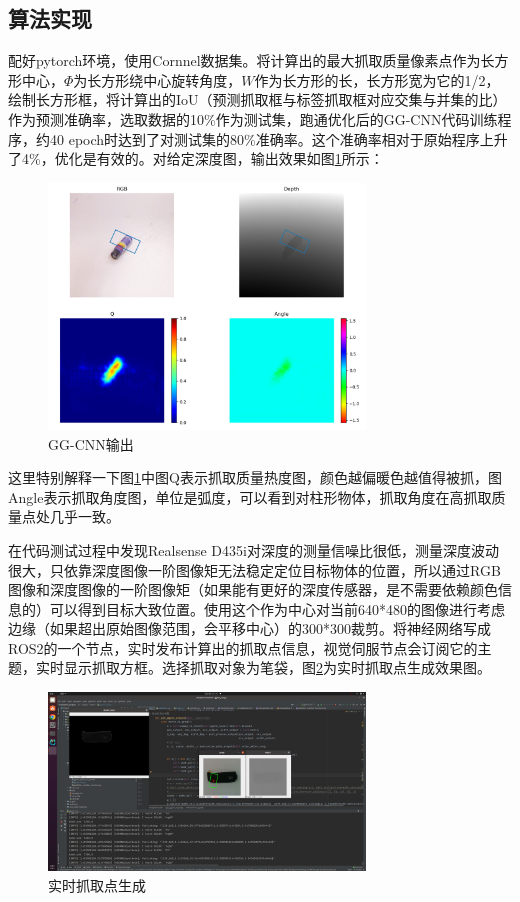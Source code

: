 \documentclass[fontset=fandol,type=bachelor,campus=harbin]{hithesisbook}
\begin{document}
\subsection{算法实现}
配好pytorch环境，使用Cornnel数据集。将计算出的最大抓取质量像素点作为长方形中心，$\varPhi$为长方形绕中心旋转角度，$W$作为长方形的长，长方形宽为它的1/2，绘制长方形框，将计算出的IoU（预测抓取框与标签抓取框对应交集与并集的比）作为预测准确率，选取数据的10\%作为测试集，跑通优化后的GG-CNN代码训练程序，约40 epoch时达到了对测试集的80\%准确率。这个准确率相对于原始程序上升了4\%，优化是有效的。对给定深度图，输出效果如图\ref{GG-CNN输出（初始）}所示：
\begin{figure}[h]
\centering
\includegraphics[width = 0.75\textwidth]{chapter3/GG-CNN输出（初始）}
\caption{GG-CNN输出}
\label{GG-CNN输出（初始）}
\end{figure}


这里特别解释一下图\ref{GG-CNN输出（初始）}中图Q表示抓取质量热度图，颜色越偏暖色越值得被抓，图Angle表示抓取角度图，单位是弧度，可以看到对柱形物体，抓取角度在高抓取质量点处几乎一致。


在代码测试过程中发现Realsense D435i对深度的测量信噪比很低，测量深度波动很大，只依靠深度图像一阶图像矩无法稳定定位目标物体的位置，所以通过RGB图像和深度图像的一阶图像矩（如果能有更好的深度传感器，是不需要依赖颜色信息的）可以得到目标大致位置。使用这个作为中心对当前640*480的图像进行考虑边缘（如果超出原始图像范围，会平移中心）的300*300裁剪。将神经网络写成ROS2的一个节点，实时发布计算出的抓取点信息，视觉伺服节点会订阅它的主题，实时显示抓取方框。选择抓取对象为笔袋，图\ref{实时抓取点生成}为实时抓取点生成效果图。
\begin{figure}[h]
\centering
\includegraphics[width = 0.75\textwidth]{chapter3/实时抓取点生成}
\caption{实时抓取点生成}
\label{实时抓取点生成}
\end{figure}
\end{document}
